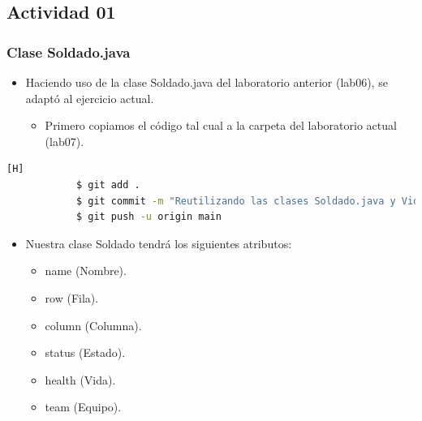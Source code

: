 \documentclass{article}
\begin{document}
    \subsection{Actividad 01}
    
        \subsubsection{Clase Soldado.java}
        \begin{itemize}	
            \item Haciendo uso de la clase Soldado.java del laboratorio anterior (lab06), se adaptó al ejercicio actual.
            \begin{itemize}
                \item Primero copiamos el código tal cual a la carpeta del laboratorio actual (lab07).
            \end{itemize}
        \end{itemize}

        \begin{lstlisting}[language=bash,caption={Commit \href{https://github.com/hernanchoquehuanca/fp2-23b/commit/88096212a7228ae8637f2b46b77eee9abe96f443}{8809621}: En el primer commit se reutilizaba la clase Soldado.java del laboratorio anterior (lab06)}][H]
    		$ git add .
    		$ git commit -m "Reutilizando las clases Soldado.java y VideoJuego3.java del Lab06"
    		$ git push -u origin main
    	\end{lstlisting}
        \newpage
        \begin{itemize}
            \item Nuestra clase Soldado tendrá los siguientes atributos:
            \begin{itemize}
                \item name (Nombre).
                \item row (Fila).
                \item column (Columna).
                \item status (Estado).
                \item health (Vida).
                \item team (Equipo).
            \end{itemize}
            
        \end{itemize}
        
\end{document}

